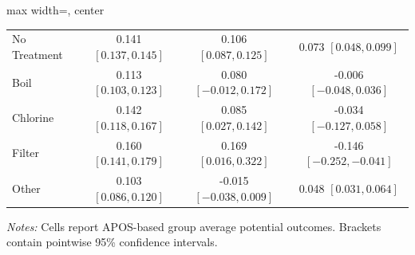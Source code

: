 \begin{table}[p]
\begin{adjustbox}{max width=\linewidth, center}
\begin{tabular}{lccc}
\midrule
No Treatment & 0.141 {\scriptsize$[0.137,0.145]$} & 0.106 {\scriptsize$[0.087,0.125]$} & 0.073 {\scriptsize$[0.048,0.099]$} \\
Boil & 0.113 {\scriptsize$[0.103,0.123]$} & 0.080 {\scriptsize$[-0.012,0.172]$} & -0.006 {\scriptsize$[-0.048,0.036]$} \\
Chlorine & 0.142 {\scriptsize$[0.118,0.167]$} & 0.085 {\scriptsize$[0.027,0.142]$} & -0.034 {\scriptsize$[-0.127,0.058]$} \\
Filter & 0.160 {\scriptsize$[0.141,0.179]$} & 0.169 {\scriptsize$[0.016,0.322]$} & -0.146 {\scriptsize$[-0.252,-0.041]$} \\
Other & 0.103 {\scriptsize$[0.086,0.120]$} & -0.015 {\scriptsize$[-0.038,0.009]$} & 0.048 {\scriptsize$[0.031,0.064]$} \\
\bottomrule
\end{tabular}
\end{adjustbox}
\par\vspace{3pt}
\begin{minipage}{\linewidth}\footnotesize \textit{Notes:} Cells report APOS-based group average potential outcomes. Brackets contain pointwise 95\% confidence intervals.\end{minipage}
\end{table}
